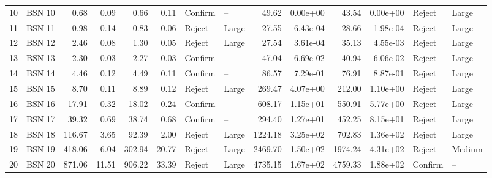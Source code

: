 \begin{tabular}{llrrrrllrrrrll}
10 &  BSN 10 &               0.68 &   0.09 &                0.66 &   0.11 &  Confirm &          -- &                    49.62 &  0.00e+00 &                     43.54 &  0.00e+00 &   Reject &       Large \\
11 &  BSN 11 &               0.98 &   0.14 &                0.83 &   0.06 &   Reject &       Large &                    27.55 &  6.43e-04 &                     28.66 &  1.98e-04 &   Reject &       Large \\
12 &  BSN 12 &               2.46 &   0.08 &                1.30 &   0.05 &   Reject &       Large &                    27.54 &  3.61e-04 &                     35.13 &  4.55e-03 &   Reject &       Large \\
13 &  BSN 13 &               2.30 &   0.03 &                2.27 &   0.03 &  Confirm &          -- &                    47.04 &  6.69e-02 &                     40.94 &  6.06e-02 &   Reject &       Large \\
14 &  BSN 14 &               4.46 &   0.12 &                4.49 &   0.11 &  Confirm &          -- &                    86.57 &  7.29e-01 &                     76.91 &  8.87e-01 &   Reject &       Large \\
15 &  BSN 15 &               8.70 &   0.11 &                8.89 &   0.12 &   Reject &       Large &                   269.47 &  4.07e+00 &                    212.00 &  1.10e+00 &   Reject &       Large \\
16 &  BSN 16 &              17.91 &   0.32 &               18.02 &   0.24 &  Confirm &          -- &                   608.17 &  1.15e+01 &                    550.91 &  5.77e+00 &   Reject &       Large \\
17 &  BSN 17 &              39.32 &   0.69 &               38.74 &   0.68 &  Confirm &          -- &                   294.40 &  1.27e+01 &                    452.25 &  8.15e+01 &   Reject &       Large \\
18 &  BSN 18 &             116.67 &   3.65 &               92.39 &   2.00 &   Reject &       Large &                  1224.18 &  3.25e+02 &                    702.83 &  1.36e+02 &   Reject &       Large \\
19 &  BSN 19 &             418.06 &   6.04 &              302.94 &  20.77 &   Reject &       Large &                  2469.70 &  1.50e+02 &                   1974.24 &  4.31e+02 &   Reject &      Medium \\
20 &  BSN 20 &             871.06 &  11.51 &              906.22 &  33.39 &   Reject &       Large &                  4735.15 &  1.67e+02 &                   4759.33 &  1.88e+02 &  Confirm &          -- \\
\bottomrule
\end{tabular}
